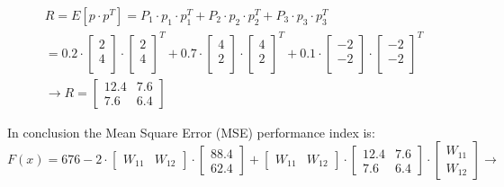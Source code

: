 \[
\begin{gathered}
	R = E[p \cdot p^T] = P_1 \cdot p_1 \cdot p_1^T + P_2 \cdot p_2 \cdot p_2^T + P_3 \cdot p_3 \cdot p_3^T \\ = 0.2 \cdot \left[
	\begin{array}{c}  
		2 \\  
		4 \\
	\end{array}
	\right] \cdot \left[
	\begin{array}{c}  
		2 \\  
		4 \\
	\end{array}
	\right]^T +  0.7 \cdot \left[
	\begin{array}{c}  
		4 \\  
		2 \\
	\end{array}
	\right] \cdot \left[
	\begin{array}{c}  
		4 \\  
		2 \\
	\end{array}
	\right]^T +  0.1 \cdot \left[
	\begin{array}{c}  
		-2 \\  
		-2 \\
	\end{array}
	\right] \cdot \left[
	\begin{array}{c}  
		-2 \\  
		-2 \\
	\end{array}
	\right]^T \\
	\rightarrow R = \left[
	\begin{array}{cc}
		12.4 & 7.6 \\
		7.6 & 6.4
	\end{array}
	\right]	
\end{gathered}
\]

\vspace{4mm}
In conclusion the Mean Square Error (MSE) performance index is:
\[
F(x) = 676 - 2 \cdot \left[\begin{array}{cc}
	W_{11} & W_{12}
\end{array}
\right] \cdot \left[\begin{array}{c}
	88.4 \\
	62.4
\end{array}
\right] + \left[\begin{array}{cc}
	W_{11} & W_{12}
\end{array}
\right] \cdot \left[
\begin{array}{cc}
	12.4 & 7.6 \\
	7.6 & 6.4
\end{array}
\right]	\cdot \left[\begin{array}{c}
	W_{11} \\
	W_{12}
\end{array}
\right] \rightarrow
\]

